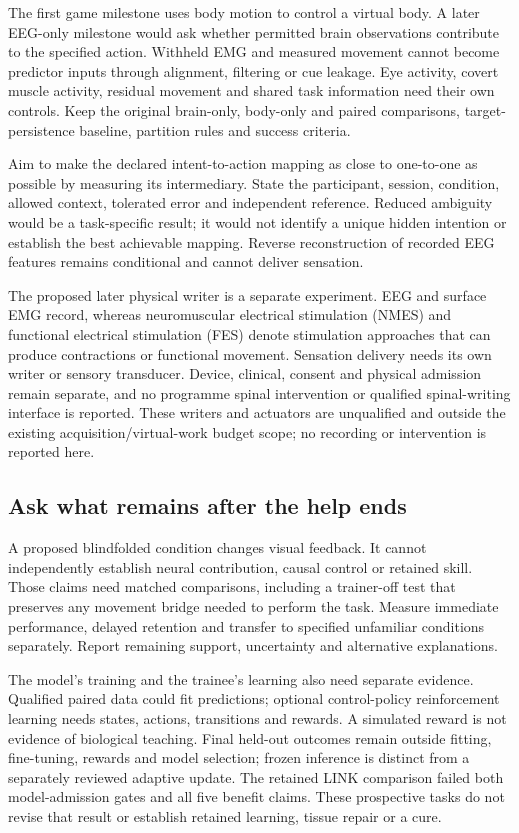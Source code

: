 The first game milestone uses body motion to control a virtual body. A later
EEG-only milestone would ask whether permitted brain observations contribute to
the specified action. Withheld EMG and measured movement cannot become predictor
inputs through alignment, filtering or cue leakage. Eye activity, covert muscle
activity, residual movement and shared task information need their own controls.
Keep the original brain-only, body-only and paired comparisons, target-persistence
baseline, partition rules and success criteria.

Aim to make the declared intent-to-action mapping as close to one-to-one as
possible by measuring its intermediary. State the participant, session, condition,
allowed context, tolerated error and independent reference. Reduced ambiguity
would be a task-specific result; it would not identify a unique hidden intention
or establish the best achievable mapping. Reverse reconstruction of recorded
EEG features remains conditional and cannot deliver sensation.

The proposed later physical writer is a separate experiment. EEG and surface
EMG record, whereas neuromuscular electrical stimulation (NMES) and functional electrical stimulation (FES) denote stimulation approaches that can produce
contractions or functional movement. Sensation delivery needs its own writer or
sensory transducer. Device, clinical, consent and physical admission remain
separate, and no programme spinal intervention or qualified spinal-writing interface is reported. These writers and
actuators are unqualified and outside the existing acquisition/virtual-work
budget scope; no recording or intervention is reported here.

\subsection{Ask what remains after the help ends}

A proposed blindfolded condition changes visual feedback. It cannot independently
establish neural contribution, causal control or retained skill. Those claims
need matched comparisons, including a trainer-off test that preserves any movement
bridge needed to perform the task. Measure immediate performance, delayed
retention and transfer to specified unfamiliar conditions separately. Report
remaining support, uncertainty and alternative explanations.

The model's training and the trainee's learning also need separate evidence.
Qualified paired data could fit predictions; optional control-policy reinforcement
learning needs states, actions, transitions and rewards. A simulated reward is
not evidence of biological teaching. Final held-out outcomes remain outside
fitting, fine-tuning, rewards and model selection; frozen inference is distinct
from a separately reviewed adaptive update. The retained LINK comparison failed
both model-admission gates and all five benefit claims. These prospective tasks
do not revise that result or establish retained learning, tissue repair or a cure.
